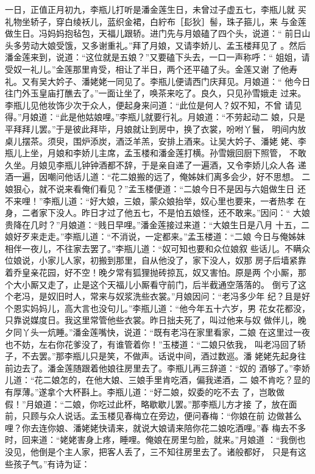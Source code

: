 一日，正值正月初九，李瓶儿打听是潘金莲生日，未曾过子虚五七，李瓶儿就
买礼物坐轿子，穿白绫袄儿，蓝织金裙，白紵布［髟狄］髻，珠子箍儿，来
与金莲做生日。冯妈妈抱毡包，天福儿跟轿。进门先与月娘磕了四个头，说道：“
前日山头多劳动大娘受饿，又多谢重礼。”拜了月娘，又请李娇儿、孟玉楼拜见了
。然后潘金莲来到，说道：“这位就是五娘？”又要磕下头去，一口一声称呼：“
姐姐，请受奴一礼儿。”金莲那里肯受，相让了半日，两个还平磕了头。金莲又谢
了他寿礼。又有吴大妗子、潘姥姥一同见了。李瓶儿便请西门庆拜见。月娘道：“
他今日往门外玉皇庙打醮去了。”一面让坐了，唤茶来吃了。良久，只见孙雪娥走
过来。李瓶儿见他妆饰少次于众人，便起身来问道：“此位是何人？奴不知，不曾
请见得。”月娘道：“此是他姑娘哩。”李瓶儿就要行礼。月娘道：“不劳起动二
娘，只是平拜拜儿罢。”于是彼此拜毕，月娘就让到房中，换了衣裳，吩咐丫鬟，
明间内放桌儿摆茶。须臾，围炉添炭，酒泛羊羔，安排上酒来。让吴大妗子、潘姥
姥、李瓶儿上坐，月娘和李娇儿主席，孟玉楼和潘金莲打横。孙雪娥回厨下照管，
不敢久坐。月娘见李瓶儿钟钟酒都不辞，于是亲自递了一遍酒，又令李娇儿众人各
递酒一遍，因嘲问他话儿道：“花二娘搬的远了，俺姊妹们离多会少，好不思想。
二娘狠心，就不说来看俺们看见？”孟玉楼便道：“二娘今日不是因与六姐做生日
还不来哩！”李瓶儿道：“好大娘，三娘，蒙众娘抬举，奴心里也要来，一者热孝
在身，二者家下没人。昨日才过了他五七，不是怕五娘怪，还不敢来。”因问：“
大娘贵降在几时？”月娘道：“贱日早哩。”潘金莲接过来道：“大娘生日是八月
十五，二娘好歹来走走。”李瓶儿道：“不消说，一定都来。”孟玉楼道：“二娘
今日与俺姊妹相伴一夜儿，不往家去罢了。”李瓶儿道：“奴可知也要和众位娘叙
些话儿。不瞒众位娘说，小家儿人家，初搬到那里，自从他没了，家下没人，奴那
房子后墙紧靠着乔皇亲花园，好不空！晚夕常有狐狸抛砖掠瓦，奴又害怕。原是两
个小厮，那个大小厮又走了，止是这个天福儿小厮看守前门，后半截通空落落的。
倒亏了这个老冯，是奴旧时人，常来与奴浆洗些衣裳。”月娘因问：“老冯多少年
纪？且是好个恩实妈妈儿，高大言也没句儿。”李瓶儿道：“他今年五十六岁，男
花女花都没，只靠说媒度日。我这里常管他些衣裳。昨日拙夫死了，叫过他来与奴
做伴儿，晚夕同丫头一炕睡。”潘金莲嘴快，说道：“既有老冯在家里看家，二娘
在这里过一夜也不妨，左右你花爹没了，有谁管着你！”玉楼道：“二娘只依我，
叫老冯回了轿子，不去罢。”那李瓶儿只是笑，不做声。话说中间，酒过数巡。潘
姥姥先起身往前边去了。潘金莲随跟着他娘往房里去了。李瓶儿再三辞道：“奴的
酒够了。”李娇儿道：“花二娘怎的，在他大娘、三娘手里肯吃酒，偏我递酒，二
娘不肯吃？显的有厚薄。”遂拿个大杯斟上。李瓶儿道：“好二娘，奴委的吃不去
了，岂敢做假！”月娘道：“二娘，你吃过此杯，略歇歇儿罢。”那李瓶儿方才接
了，放在面前，只顾与众人说话。孟玉楼见春梅立在旁边，便问春梅：“你娘在前
边做甚么哩？你去连你娘、潘姥姥快请来，就说大娘请来陪你花二娘吃酒哩。”春
梅去不多时，回来道：“姥姥害身上疼，睡哩。俺娘在房里匀脸，就来。”月娘道
：“我倒也没见，他倒是个主人家，把客人丢了，三不知往房里去了。诸般都好，
只是有这些孩子气。”有诗为证：

